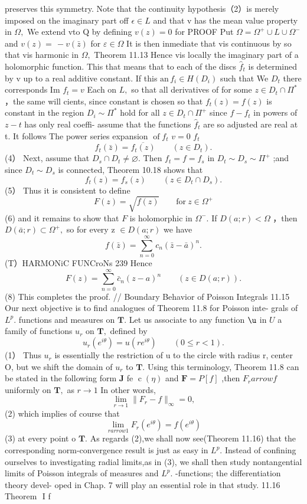 preserves this symmetry. Note that the continuity hypothesis（2）is merely imposed on the imaginary part off $\scriptstyle\epsilon\in L$ and that v has the mean value property in $\Omega,$ We extend vto Q by defining $v(z)=0$ for PROOF Put $\Omega=\Omega^{+}\cup L\cup\Omega^{-}$ and $v(z)=\,-v({\bar{z}})$ for $\varepsilon\in\Omega$ It is then inmediate that vis continuous by so that vis harmonic in $\Omega,$ Theorem 11.13 Hence vis locally the imaginary part of a holomorphic function. This that means that to each of the discs ${\hat{f}}_{t}$ is determined by v up to a real additive constant. If this ${\mathrm{an}}\,f_{i}\in H(D_{i})$ such that We $D_{t}$ there corresponds Im $f_{t}=v$ Each on $L,$ so that all derivatives of for some $z\in D_{t}\cap\Pi^{*}$ ，the same will cients, since constant is chosen so that $f_{t}(z)=f(z)$ is constant in the region $D_{i}\sim\Pi^{*}$ hold for all $z\in D_{t}\cap\Pi^{+}$ since $f-f_{t}$ in powers of $z-t$ has only real coeffi- assume that the functions ${\hat{f}}_{t}$ are so adjusted are real at t. It follows The power series expansion $\operatorname{of}f_{t}$ $v=0$ ${f}_{t}$ $$ f_{t}(\bar{z})=\overline{{{f_{t}(z)}}}\qquad(z\in D_{t}). $$ (4） Next, assume that $D_{s}\cap D_{t}\neq\varnothing.$ Then $f_{t}=f=f_{s}$ in $D_{t}\sim D_{s}\sim\Pi^{+}$ ;and since $D_{t}\sim D_{s}$ is connected, Theorem 10.18 shows that $$ f_{t}(z)=f_{s}(z)\qquad(z\in D_{t}\cap D_{s}). $$ (5） Thus it is consistent to define $$ F(z)={\sqrt{f(z)}}\qquad{\mathrm{for~}}z\in\Omega^{+} $$ (6) and it remains to show that ${\mathbf{}}F$ is holomorphic in $\Omega^{-}.$ If $D(a;r)<\Omega$ ，then $D(\bar{a};r)\subset\Omega^{+},$ so for every z $\in D(a;r)$ we have $$ f({\bar{z}})=\sum_{n=0}^{\infty}c_{n}({\bar{z}}-{\bar{a}})^{n}. $$ (T）HARMONiC FUNCroNs 239 Hence $$ F(z)=\sum_{n=0}^{\infty}\bar{c}_{n}(z-a)^{n}\qquad(z\in D(a;r)). $$ (8) This completes the proof. // Boundary Behavior of Poisson Integrals 11.15 Our next objective is to find analogues of Theorem 11.8 for Poisson inte- grals of $L^{p}.$ functions and measures on ${\boldsymbol{T}}.$ Let us associate to any function $\boldsymbol{\u}$ in $U$ a family of functions $u_{r}$ on ${\boldsymbol{T}},$ defined by $$ u_{r}(e^{i\theta})=u(r e^{i\theta})\qquad(0\le r<1). $$ (1） Thus $u_{r}$ is essentially the restriction of u to the circle with radius r, center O, but we shift the domain of $u_{r}$ to ${\boldsymbol{T}}.$ Using this terminology, Theorem 11.8 can be stated in the following form ${\boldsymbol{J}}$ fe $\operatorname{c}(\eta)$ and ${\boldsymbol{F}}=P[f]$ ,then $F_{r}{ arrow}f$ uniformly on ${\boldsymbol{T}},$ as $\scriptstyle{r\to1}$ In other words, $$ \operatorname*{lim}_{r\to1}\|F_{r}-f\|_{\infty}=0, $$ (2) which implies of course that $$ \operatorname*{lim}_{r arrow1}F_{r}(e^{i\theta})=f(e^{i\theta}) $$ (3) at every point o ${\boldsymbol{T}}.$ As regards (2),we shall now see(Theorem 11.16) that the corresponding norm-convergence result is just as easy in $L^{p}.$ Instead of confining ourselves to investigating radial limits,as in (3), we shall then study nontangential limits of Poisson integrals of measures and $L^{p}.$ -functions; the differentiation theory devel- oped in Chap. 7 will play an essential role in that study. 11.16 Theorem $$ I f\mid\leq 